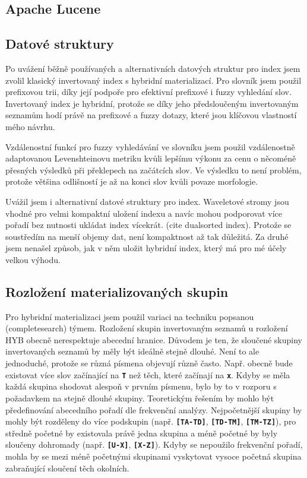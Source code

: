 \documentclass[11pt,letterpaper,oneside,openright]{book}
\newcommand{\bftt}[1]{\texttt{\textbf{#1}}}
\begin{document}
\subsection{Apache Lucene}


\subsection{Datové struktury}
Po uvážení běžně používaných a alternativních datových struktur pro index jsem
zvolil klasický invertovaný index s hybridní materializací. Pro slovník jsem
použil prefixovou trii, díky její podpoře pro efektivní prefixové i fuzzy
vyhledání slov. Invertovaný index je hybridní, protože se díky jeho
předsloučeným invertovaným seznamům hodí právě na prefixové a fuzzy dotazy,
které jsou klíčovou vlastností mého návrhu.

Vzdálenostní funkcí pro fuzzy vyhledávání ve slovníku jsem použil vzdálenostně
adaptovanou Levenshteinovu metriku kvůli lepšímu výkonu za cenu o něcoméně
přesných výsledků při překlepech na začátcích slov. Ve výsledku to není
problém, protože většina odlišností je až na konci slov kvůli povaze
morfologie.

Uvážil jsem i alternativní datové struktury pro index. Waveletové stromy jsou
vhodné pro velmi kompaktní uložení indexu a navíc mohou podporovat více pořadí
bez nutnosti ukládat index vícekrát. (cite dualsorted index). Protože se
soustředím na menší objemy dat, není kompaktnost až tak důležitá. Za druhé jsem
nenašel způsob, jak v něm uložit hybridní index, který má pro mé účely velkou
výhodu.

\subsection{Rozložení materializovaných skupin}
Pro hybridní materializaci jsem použil variaci na techniku popsanou
(completesearch) týmem. Rozložení skupin invertovaným seznamů u rozložení HYB
obecně nerespektuje abecední hranice. Důvodem je ten, že sloučené skupiny
invertovaných seznamů by měly být ideálně stejně dlouhé. Není to ale
jednoduché, protože se různá písmena objevují různě často. Např. obecně bude
existovat více slov začínající na \bftt{T} než těch, které začínají na
\bftt{x}. Kdyby se měla každá skupina shodovat alespoň v prvním písmenu, bylo
by to v rozporu s požadavkem na stejně dlouhé skupiny. Teoretickým řešením by
mohlo být předefinování abecedního pořadí dle frekvenční analýzy. Nejpočetnější
skupiny by mohly být rozděleny do více podskupin (např. \bftt{[TA-TD]},
\bftt{[TD-TM]}, \bftt{[TM-TZ]}), pro středně početné by existovala právě jedna
skupina a méně početné by byly sloučeny dohromady (např. \bftt{[U-X]},
\bftt{[X-Z]}). Kdyby se nepoužilo frekvenční pořadí, mohla by se mezi méně
početnými skupinami vyskytovat vysoce početná skupina zabraňující sloučení těch
okolních.
\end{document}
